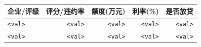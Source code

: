 \begin{tabular}{lrrrr}
\toprule
\textbf{企业/评级} & \textbf{评分/违约率} & \textbf{额度(万元)} & \textbf{利率(\%)} & \textbf{是否放贷} \\\midrule
\texttt{<val>} & \texttt{<val>} & \texttt{<val>} & \texttt{<val>} & \texttt{<val>} \\
\texttt{<val>} & \texttt{<val>} & \texttt{<val>} & \texttt{<val>} & \texttt{<val>} \\\bottomrule
\end{tabular}
